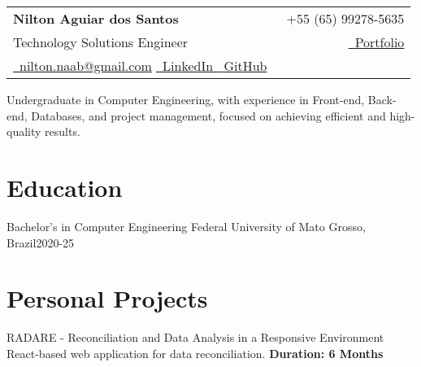 

\newcommand{\name}{Nilton Aguiar dos Santos} %
\newcommand{\course}{Computer Engineering} %
\newcommand{\phone}{+55 (65) 99278-5635} %
\newcommand{\emaila}{nilton.naab@gmail.com} %
\newcommand{\github}{https://github.com/notNilton} %
\newcommand{\linkedin}{https://www.linkedin.com/in/notnilton/} %
\newcommand{\portfolio}{https://github.com/notNilton} %




{
\begin{tabularx}{\linewidth}{L r}                                                               \\
    \textbf{\Large \name} & {\raisebox{0.0\height}{\footnotesize \faPhone}\ \phone}
    \\
    {Technology Solutions Engineer}
                          &
    \href{\portfolio}{\raisebox{0.0\height}{\footnotesize \faGlobe}\ {Portfolio}}
    \\
    \href{mailto:\emaila} {\raisebox{0.0\height}{\footnotesize \faEnvelope}\ {\emaila}}
    \href{\linkedin}{\raisebox{0.0\height}{\footnotesize \faLinkedin}\ {LinkedIn} }
    \href{\github}{\raisebox{0.0\height}{\footnotesize \faGithub}\ {GitHub} }
\end{tabularx}
}
\vspace{1mm}

Undergraduate in Computer Engineering, with experience in Front-end, Back-end, Databases, and project management, focused on achieving efficient and high-quality results.

\section{\textbf{Education}}
\resumeSubHeadingListStart
\resumeSubheading
{Bachelor’s in Computer Engineering}{}
{Federal University of Mato Grosso, Brazil}{2020-25}
\resumeSubHeadingListEnd
\vspace{-5.5mm}

\section{\textbf{Personal Projects}}
\resumeSubHeadingListStart
\resumeProject
{ RADARE - \textmd{Reconciliation and Data Analysis in a Responsive Environment}}
{React-based web application for data reconciliation.}
{\textbf{Duration: 6 Months}}

